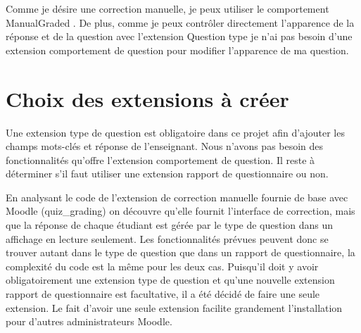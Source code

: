 Comme je désire une correction manuelle, je peux utiliser le comportement \og ManualGraded \fg{}. De plus, comme je peux contrôler directement l'apparence de la réponse et de la question avec l'extension \og Question type \fg{} je n'ai pas besoin d'une extension comportement de question pour modifier l'apparence de ma question.

\section{Choix des extensions à créer}

Une extension type de question est obligatoire dans ce projet afin d'ajouter les champs mots-clés et réponse de l'enseignant. Nous n'avons pas besoin des fonctionnalités qu'offre l'extension comportement de question. Il reste à déterminer s'il faut utiliser une extension rapport de questionnaire ou non.

En analysant le code de l'extension de correction manuelle fournie de base avec Moodle (quiz\_grading) on découvre qu'elle fournit l'interface de correction, mais que la réponse de chaque étudiant est gérée par le type de question dans un affichage en lecture seulement. Les fonctionnalités prévues peuvent donc se trouver autant dans le type de question que dans un rapport de questionnaire, la complexité du code est la même pour les deux cas. Puisqu'il doit y avoir obligatoirement une extension type de question et qu'une nouvelle extension rapport de questionnaire est facultative, il a été décidé de faire une seule extension. Le fait d'avoir une seule extension facilite grandement l'installation pour d'autres administrateurs Moodle.